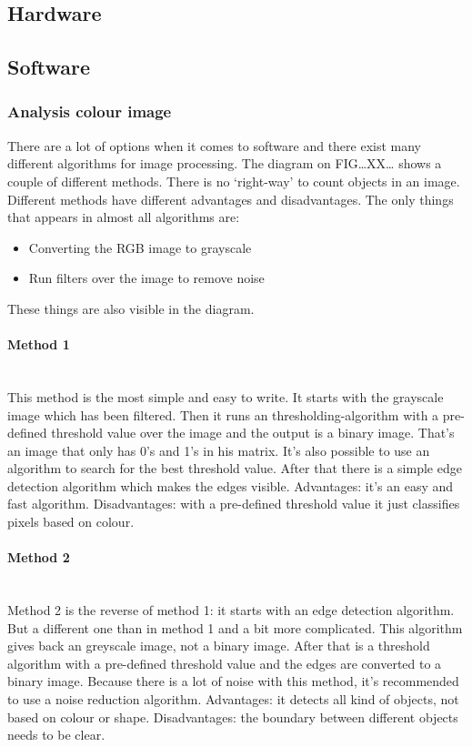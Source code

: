 \documentclass[11pt]{article}
\begin{document}
\subsection{Hardware}
\subsection{Software}
\subsubsection{Analysis colour image }

There are a lot of options when it comes to software and there exist many different algorithms for image processing. The diagram on FIG…XX… shows a couple of different methods. There is no ‘right-way’ to count objects in an image. Different methods have different advantages and disadvantages. The only things that appears in almost all algorithms are:
\begin{itemize}
\item Converting the RGB image to grayscale
\item Run filters over the image to remove noise
\end{itemize}
These things are also visible in the diagram.
\paragraph{Method 1}\mbox{}\\
This method is the most simple and easy to write. It starts with the grayscale image which has been filtered. Then it runs an thresholding-algorithm with a pre-defined threshold value over the image and the output is a binary image. That’s an image that only has 0’s and 1’s in his matrix.  It’s also possible to use an algorithm to search for the best threshold value.  After that there is a simple edge detection algorithm which makes the edges visible. 
Advantages: it’s an easy and fast algorithm.
Disadvantages: with a pre-defined threshold value it just classifies pixels based on colour. 
\paragraph{Method 2}\mbox{}\\
Method 2 is the reverse of method 1: it starts with an edge detection algorithm. But a different one than in method 1 and a bit more complicated. This algorithm gives back an greyscale image, not a binary image. After that is a threshold algorithm with a pre-defined threshold value and the edges are converted to a binary image. Because there is a lot of noise with this method, it's recommended to use a noise reduction algorithm. 
Advantages: it detects all kind of objects, not based on colour or shape.
Disadvantages: the boundary between different objects needs to be clear.
\end{document}

